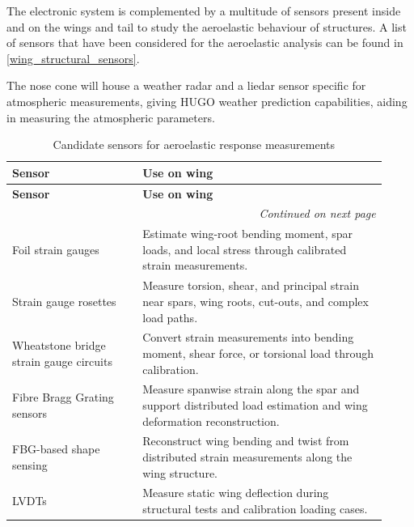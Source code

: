 The electronic system is complemented by a multitude of sensors present inside and on the wings and tail to study the aeroelastic behaviour of structures. A list of sensors that have been considered for the aeroelastic analysis can be found in \autoref{wing_structural_sensors}.

The nose cone will house a weather radar and a liedar sensor specific for atmospheric measurements, giving HUGO weather prediction capabilities, aiding in measuring the atmospheric parameters.


\begin{longtable}{|p{0.32\linewidth}|p{0.60\linewidth}|}
\caption{Candidate sensors for aeroelastic response measurements}
\label{wing_structural_sensors} \\

\hline
\textbf{Sensor} & \textbf{Use on wing} \\
\hline\hline
\endfirsthead

\hline\hline
\textbf{Sensor} & \textbf{Use on wing} \\
\hline\hline
\endhead

\hline
\multicolumn{2}{r}{\textit{Continued on next page}} \\
\endfoot

\hline
\endlastfoot

Foil strain gauges 
& Estimate wing-root bending moment, spar loads, and local stress through calibrated strain measurements. \\
\hline

Strain gauge rosettes 
& Measure torsion, shear, and principal strain near spars, wing roots, cut-outs, and complex load paths. \\
\hline

Wheatstone bridge strain gauge circuits 
& Convert strain measurements into bending moment, shear force, or torsional load through calibration. \\
\hline

Fibre Bragg Grating sensors 
& Measure spanwise strain along the spar and support distributed load estimation and wing deformation reconstruction. \\
\hline

FBG-based shape sensing 
& Reconstruct wing bending and twist from distributed strain measurements along the wing structure. \\
\hline

LVDTs 
& Measure static wing deflection during structural tests and calibration loading cases. \\
\hline


\end{longtable}
